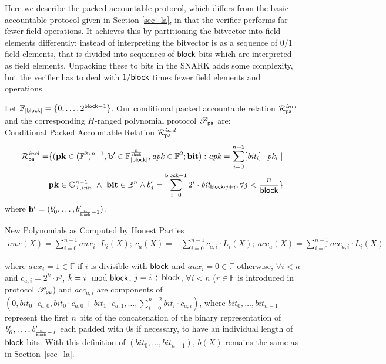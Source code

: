 
Here we describe the packed accountable protocol, which differs from the basic accountable protocol given in Section \ref{sec_la}, in that the verifier performs far fewer field operations. It achieves this by partitioning the bitvector into field elements differently:  instead of interpreting the bitvector is as a sequence of $0/1$ field elements, that is divided into sequences of $\mathsf{block}$ bits which are interpreted as field elements. Unpacking these to bits in the SNARK adds some complexity, but the verifier has to deal with $1/\mathsf{block}$ times fewer field elements and operations.


Let $\mathbb{F}_{|\mathsf{block}|} = \{0, \ldots, 2^{\mathsf{block} -1} \}$. %
Our conditional packed accountable relation $\mathcal{R}^{\mathit{incl}}_{\mathsf{pa}}$ and the corresponding $H$-ranged polynomial protocol 
$\mathscr{P}_{\mathsf{pa}}$ are:\\
 
\noindent \textsf{Conditional Packed Accountable Relation $\mathcal{R}^{\mathit{incl}}_{\mathsf{pa}}$} 
\begin{equation*}
\begin{split}
\mathcal{R}^{\mathit{incl}}_{\mathsf{pa}} = & \{(\mathbf{pk} \in (\mathbb{F}^2)^{n-1},\mathbf{b'} \in \mathbb{F}_{|\mathsf{block}|}^{\frac{n}{\mathsf{block}}},
\mathit{apk} \in \mathbb{F}^2; \mathbf{bit}) : \mathit{apk} = \sum_{i=0}^{n-2} [\mathit{bit_i}] \cdot \mathit{pk_i} \ | \\ 
& \mathbf{pk} \in \mathbb{G}_{\mathit{1,inn}}^{n-1} \ \wedge \ \mathbf{bit} \in \mathbb{B}^n  \wedge b'_{j} = \sum_{i=0}^{\mathsf{block} -1}2^i \cdot \mathit{bit_{\mathsf{block} \cdot j + i}}, \forall j < \frac{n}{\mathsf{block}} \} 
\end{split}
\end{equation*}
where $\mathbf{b'} = (b'_{0}, \ldots, b'_{{\frac{n}{\mathsf{block}}} -1})$.

\noindent \textsf{New Polynomials as Computed by Honest Parties} 
\begin{align*}
aux(X) =  \sum_{i=0}^{n-1}aux_i \cdot L_i(X); \ c_{a}(X) = & \sum_{i=0}^{n-1} c_{a,i} \cdot L_i(X); \ acc_{a}(X)  =   \sum_{i=0}^{n-1} acc_{a,i}  \cdot L_i(X)
\end{align*}

\noindent where $aux_{i} = 1 \in \mathbb{F}$ if $i$ is divisible with $\mathsf{block}$ and $aux_{i} = 0 \in \mathbb{F}$ otherwise, $\forall i < n$ 
and $c_{a,i} = 2^k \cdot r^j$, $k = i \mod {\mathsf{block}}$, $j = i \div \mathsf{block}$, $\forall i < n$ ($r \in \mathbb{F}$ is introduced in protocol $\mathscr{P}_{\mathsf{pa}}$) and $acc_{a,i}$ are components of $(0, \mathit{bit}_0 \cdot c_{a,0}, \mathit{bit}_0 \cdot c_{a,0}+ \mathit{bit}_1  \cdot c_{a,1}, \ldots, \sum_{i=0}^{n-2}\mathit{bit}_i \cdot c_{a,i})$, where $\mathit{bit_{0}}, \ldots, \mathit{bit_{n-1}}$ represent the first $n$ 
bits of the concatenation of the binary representation of 
$\mathit{b'_{0}}, \ldots, \mathit{b'_{\frac{n}{\mathsf{block}}-1}}$ each 
padded  with 0s  if necessary, to have an individual length of $\mathsf{block}$ bits. With this definition of $(\mathit{bit_{0}}, \ldots, \mathit{bit_{n-1}})$, $b(X)$ remains the same as in Section~\ref{sec_la}.\\

